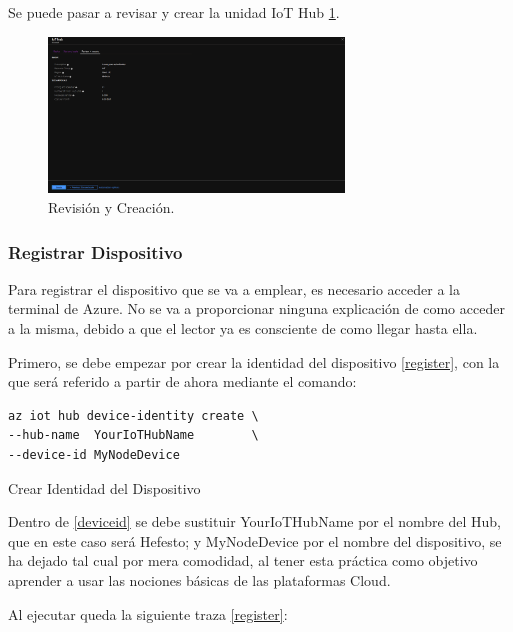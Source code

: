 \documentclass[english,runningheads,a4paper]{llncs}[2018/03/10]
\begin{document}
Se puede pasar a revisar y crear la unidad IoT Hub \hyperref[review]{\ref{review}}.

\begin{figure}[h!]
 \centering
 \includegraphics[width=0.7\textwidth]{./IoT/MicrosoftAzure/1-3_create_resource.png}
 \caption{Revisión y Creación.}
 \label{review}
\end{figure}

\subsubsection{Registrar Dispositivo}

Para registrar el dispositivo que se va a emplear, es necesario acceder a la
terminal de Azure. No se va a proporcionar ninguna explicación de como acceder a
la misma, debido a que el lector ya es consciente de como llegar hasta ella.

Primero, se debe empezar por crear la identidad del dispositivo 
\hyperref[register]{\ref{register}}, con la que será referido a partir de ahora 
mediante el comando:

\begin{listing}[htp]
\centering
    \begin{verbatim}
az iot hub device-identity create \
--hub-name  YourIoTHubName        \
--device-id MyNodeDevice
    \end{verbatim}
\caption{Crear Identidad del Dispositivo}
\label{deviceid}
\end{listing}

Dentro de \hyperref[deviceid]{\ref{deviceid}} se debe sustituir YourIoTHubName
por el nombre del Hub, que en este caso será Hefesto; y MyNodeDevice por el
nombre del dispositivo, se ha dejado tal cual por mera comodidad, al tener esta
práctica como objetivo aprender a usar las nociones básicas de las plataformas
Cloud.

Al ejecutar queda la siguiente traza \hyperref[register]{\ref{register}}:
\end{document}
